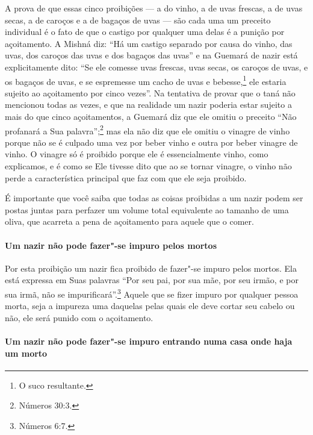 \begin{multicols}{2}
A prova de que essas cinco proibições --- a do vinho, a de uvas
frescas, a de uvas secas, a de caroços e a de bagaços de uvas --- são
cada uma um preceito individual é o fato de que o castigo por qualquer uma delas é a
punição por açoitamento. A Mishná\starr{} diz: ``Há um castigo separado por
causa do vinho, das uvas, dos caroços das uvas e dos bagaços das uvas''
e na Guemará\starr{} de nazir\starr{} está explicitamente dito: ``Se ele comesse uvas
frescas, uvas secas, os caroços de uvas, e os bagaços de uvas, e se
espremesse um cacho de uvas e bebesse,\footnote{O suco resultante.} ele estaria
sujeito ao açoitamento por cinco vezes''. Na tentativa de provar que o
taná\starr{} não mencionou todas as vezes, e que na realidade um nazir\starr{}
poderia estar sujeito a mais do que cinco açoitamentos, a Guemará\starr{} diz
que ele omitiu o preceito ``Não profanará a Sua palavra'';\footnote{Números
30:3.} mas ela não diz que ele omitiu o vinagre de vinho porque não se é
culpado uma vez por beber vinho e outra por beber vinagre de vinho. O
vinagre só é proibido porque ele é essencialmente vinho, como
explicamos, e é como se Ele tivesse dito que ao se tornar vinagre, o
vinho não perde a característica principal que faz com que ele seja
proibido.

É importante que você saiba que todas as coisas proibidas a um nazir\starr{}
podem ser postas juntas para perfazer um volume total equivalente ao
tamanho de uma oliva, que acarreta a pena de açoitamento para aquele
que o comer.

\paragraph{Um nazir\starr{} não pode fazer"-se impuro pelos mortos}

Por esta proibição um nazir\starr{} fica proibido de fazer"-se impuro pelos
mortos. Ela está expressa em Suas palavras ``Por seu pai, por sua mãe,
por seu irmão, e por sua irmã, não se impurificará''.\footnote{Números 6:7.}
Aquele que se fizer impuro por qualquer pessoa morta, seja a impureza
uma daquelas pelas quais ele deve cortar seu cabelo ou não, ele será
punido com o açoitamento.

\paragraph{Um nazir\starr{} não pode fazer"-se impuro entrando numa casa onde haja um morto}


\end{multicols}
